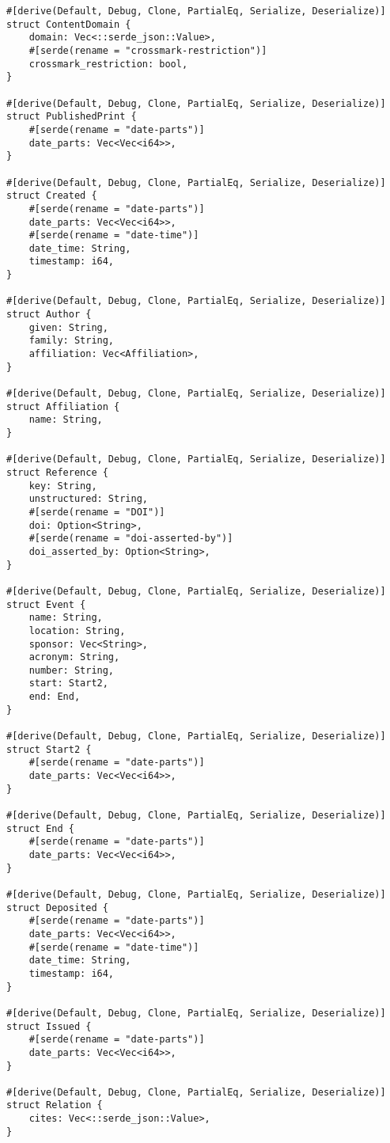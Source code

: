 \begin{multicols}{2}
\begin{verbatim}
#[derive(Default, Debug, Clone, PartialEq, Serialize, Deserialize)]
struct ContentDomain {
    domain: Vec<::serde_json::Value>,
    #[serde(rename = "crossmark-restriction")]
    crossmark_restriction: bool,
}

#[derive(Default, Debug, Clone, PartialEq, Serialize, Deserialize)]
struct PublishedPrint {
    #[serde(rename = "date-parts")]
    date_parts: Vec<Vec<i64>>,
}

#[derive(Default, Debug, Clone, PartialEq, Serialize, Deserialize)]
struct Created {
    #[serde(rename = "date-parts")]
    date_parts: Vec<Vec<i64>>,
    #[serde(rename = "date-time")]
    date_time: String,
    timestamp: i64,
}

#[derive(Default, Debug, Clone, PartialEq, Serialize, Deserialize)]
struct Author {
    given: String,
    family: String,
    affiliation: Vec<Affiliation>,
}

#[derive(Default, Debug, Clone, PartialEq, Serialize, Deserialize)]
struct Affiliation {
    name: String,
}

#[derive(Default, Debug, Clone, PartialEq, Serialize, Deserialize)]
struct Reference {
    key: String,
    unstructured: String,
    #[serde(rename = "DOI")]
    doi: Option<String>,
    #[serde(rename = "doi-asserted-by")]
    doi_asserted_by: Option<String>,
}

#[derive(Default, Debug, Clone, PartialEq, Serialize, Deserialize)]
struct Event {
    name: String,
    location: String,
    sponsor: Vec<String>,
    acronym: String,
    number: String,
    start: Start2,
    end: End,
}

#[derive(Default, Debug, Clone, PartialEq, Serialize, Deserialize)]
struct Start2 {
    #[serde(rename = "date-parts")]
    date_parts: Vec<Vec<i64>>,
}

#[derive(Default, Debug, Clone, PartialEq, Serialize, Deserialize)]
struct End {
    #[serde(rename = "date-parts")]
    date_parts: Vec<Vec<i64>>,
}

#[derive(Default, Debug, Clone, PartialEq, Serialize, Deserialize)]
struct Deposited {
    #[serde(rename = "date-parts")]
    date_parts: Vec<Vec<i64>>,
    #[serde(rename = "date-time")]
    date_time: String,
    timestamp: i64,
}

#[derive(Default, Debug, Clone, PartialEq, Serialize, Deserialize)]
struct Issued {
    #[serde(rename = "date-parts")]
    date_parts: Vec<Vec<i64>>,
}

#[derive(Default, Debug, Clone, PartialEq, Serialize, Deserialize)]
struct Relation {
    cites: Vec<::serde_json::Value>,
}
\end{verbatim}
\end{multicols}
